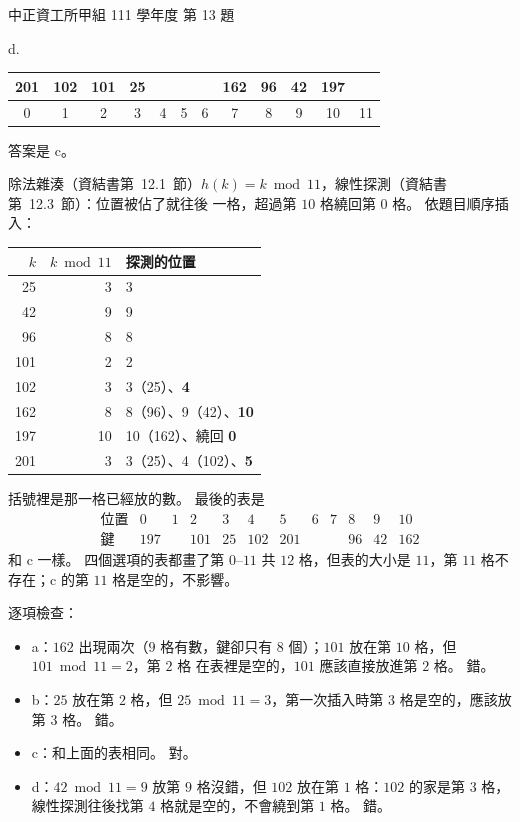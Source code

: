 \begin{pastexam}[label={px:ccu-111-swa-05}]{中正資工所甲組 111 學年度 第 13 題}
{\smallskip
d.\\
\begin{tabular}{|*{12}{c|}}
\hline
201 & 102 & 101 & 25 &  &  &  & 162 & 96 & 42 & 197 & \\ \hline
\multicolumn{1}{c}{\scriptsize 0} & \multicolumn{1}{c}{\scriptsize 1} & \multicolumn{1}{c}{\scriptsize 2} & \multicolumn{1}{c}{\scriptsize 3} & \multicolumn{1}{c}{\scriptsize 4} & \multicolumn{1}{c}{\scriptsize 5} & \multicolumn{1}{c}{\scriptsize 6} & \multicolumn{1}{c}{\scriptsize 7} & \multicolumn{1}{c}{\scriptsize 8} & \multicolumn{1}{c}{\scriptsize 9} & \multicolumn{1}{c}{\scriptsize 10} & \multicolumn{1}{c}{\scriptsize 11}
\end{tabular}
}
\end{pastexam}

\begin{pastsoln}
答案是 c。

除法雜湊（資結書第~12.1~節）$h(k) = k \bmod 11$，線性探測（資結書第~12.3~節）：位置被佔了就往後
一格，超過第 $10$ 格繞回第 $0$ 格。 依題目順序插入：
\begin{center}
\begin{tabular}{rrl}
\toprule
$k$ & $k \bmod 11$ & 探測的位置 \\
\midrule
25 & 3 & 3 \\
42 & 9 & 9 \\
96 & 8 & 8 \\
101 & 2 & 2 \\
102 & 3 & 3（25）、\textbf{4} \\
162 & 8 & 8（96）、9（42）、\textbf{10} \\
197 & 10 & 10（162）、繞回 \textbf{0} \\
201 & 3 & 3（25）、4（102）、\textbf{5} \\
\bottomrule
\end{tabular}
\end{center}
括號裡是那一格已經放的數。 最後的表是
\[
\begin{array}{c|ccccccccccc}
\text{位置} & 0 & 1 & 2 & 3 & 4 & 5 & 6 & 7 & 8 & 9 & 10 \\ \hline
\text{鍵} & 197 & & 101 & 25 & 102 & 201 & & & 96 & 42 & 162
\end{array}
\]
和 c 一樣。 四個選項的表都畫了第 $0$--$11$ 共 $12$ 格，但表的大小是 $11$，第 $11$ 格不存在；c 的第
$11$ 格是空的，不影響。

逐項檢查：
\begin{itemize}
\item a：$162$ 出現兩次（$9$ 格有數，鍵卻只有 $8$ 個）；$101$ 放在第 $10$ 格，但 $101 \bmod 11 = 2$，第 $2$ 格
在表裡是空的，$101$ 應該直接放進第 $2$ 格。 錯。
\item b：$25$ 放在第 $2$ 格，但 $25 \bmod 11 = 3$，第一次插入時第 $3$ 格是空的，應該放第 $3$ 格。 錯。
\item c：和上面的表相同。 對。
\item d：$42 \bmod 11 = 9$ 放第 $9$ 格沒錯，但 $102$ 放在第 $1$ 格：$102$ 的家是第 $3$ 格，線性探測往後找第
$4$ 格就是空的，不會繞到第 $1$ 格。 錯。
\end{itemize}
\end{pastsoln}
